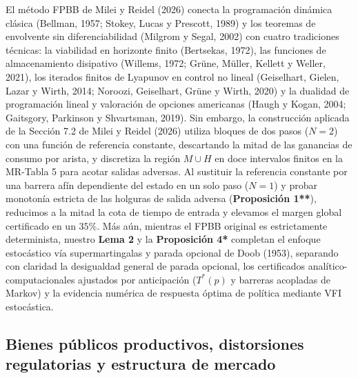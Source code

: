 \documentclass[11pt,letterpaper]{article}
\theoremstyle{plain}
\begin{document}
El método FPBB de Milei y Reidel (2026) conecta la programación dinámica clásica (Bellman, 1957; Stokey, Lucas y Prescott, 1989) y los teoremas de envolvente sin diferenciabilidad (Milgrom y Segal, 2002) con cuatro tradiciones técnicas: la viabilidad en horizonte finito (Bertsekas, 1972), las funciones de almacenamiento disipativo (Willems, 1972; Grüne, Müller, Kellett y Weller, 2021), los iterados finitos de Lyapunov en control no lineal (Geiselhart, Gielen, Lazar y Wirth, 2014; Noroozi, Geiselhart, Grüne y Wirth, 2020) y la dualidad de programación lineal y valoración de opciones americanas (Haugh y Kogan, 2004; Gaitsgory, Parkinson y Shvartsman, 2019). Sin embargo, la construcción aplicada de la Sección 7.2 de Milei y Reidel (2026) utiliza bloques de dos pasos ($N=2$) con una función de referencia constante, descartando la mitad de las ganancias de consumo por arista, y discretiza la región $M\cup H$ en doce intervalos finitos en la MR-Tabla 5 para acotar salidas adversas. Al sustituir la referencia constante por una barrera afín dependiente del estado en un solo paso ($N=1$) y probar monotonía estricta de las holguras de salida adversa (\textbf{Proposición 1**}), reducimos a la mitad la cota de tiempo de entrada y elevamos el margen global certificado en un $35\%$. Más aún, mientras el FPBB original es estrictamente determinista, nuestro \textbf{Lema 2} y la \textbf{Proposición 4*} completan el enfoque estocástico vía supermartingalas y parada opcional de Doob (1953), separando con claridad la desigualdad general de parada opcional, los certificados analítico-computacionales ajustados por anticipación ($T^*(p)$ y barreras acopladas de Markov) y la evidencia numérica de respuesta óptima de política mediante VFI estocástica.

\subsection{Bienes públicos productivos, distorsiones regulatorias y estructura de mercado}
\end{document}
